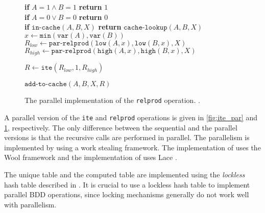 \begin{figure}
	\centering
	\begin{algorithm}[H]
		\SetStartEndCondition{ }{}{}%
		\AlgoDontDisplayBlockMarkers\SetAlgoNoEnd\SetAlgoNoLine%

		 {
			\textbf{if} $A=1 \wedge B=1$ \textbf{return} $1$ \\
			\textbf{if} $A=0 \vee B=0$ \textbf{return} $0$ \\
			\textbf{if} $\texttt{in-cache}(A, B, X)$ \textbf{return} $\texttt{cache-lookup}(A, B, X)$ \\
			$x \gets \texttt{min}(\texttt{var}(A), \texttt{var}(B))$ \\

			\While{} {
				$R_{low} \gets \texttt{par-relprod}(\texttt{low}(A, x), \texttt{low}(B, x), X)$ \\
				$R_{high} \gets \texttt{par-relprod}(\texttt{high}(A, x), \texttt{high}(B, x), X)$ \\
			}

			 {
				$R \gets \texttt{ite}(R_{low}, 1, R_{high})$
			}
			
			$\texttt{add-to-cache}(A, B, X, R)$ \\
		}
	\end{algorithm}

	\caption{The parallel implementation of the \texttt{relprod} operation. \cite{sylvan_multicore_bdd}.}
	\label{fig:relprod_par}
\end{figure}

A parallel version of the \texttt{ite} and \texttt{relprod} operations is given in \ref{fig:ite_par} and \ref{fig:relprod_par}, respectively. The only difference between the sequential and the parallel versions is that the recursive calls are performed in parallel. The parallelism is implemented by using a work stealing framework. The implementation of \cite{dijk2012parallelization} uses the Wool framework \cite{faxen2010efficient} and the implementation of \cite{sylvan_multicore_bdd} uses Lace \cite{dijk2013lace}. 

The unique table and the computed table are implemented using the \emph{lockless} hash table described in \cite{so73119}. It is crucial to use a lockless hash table to implement parallel BDD operations, since locking mechanisms generally do not work well with parallelism.  

